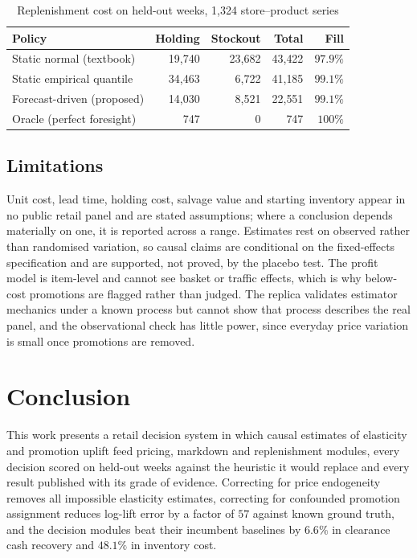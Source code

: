 \documentclass[conference,a4paper]{IEEEtran}
\begin{document}
\begin{table}[!t]
\caption{Replenishment cost on held-out weeks, 1{,}324 store--product series}
\label{tab:inv}
\centering
\footnotesize
\begin{tabular}{lrrrr}
\toprule
Policy & Holding & Stockout & Total & Fill \\
\midrule
Static normal (textbook)   & 19{,}740 & 23{,}682 & 43{,}422 & $97.9\%$ \\
Static empirical quantile  & 34{,}463 &  6{,}722 & 41{,}185 & $99.1\%$ \\
Forecast-driven (proposed) & 14{,}030 &  8{,}521 & 22{,}551 & $99.1\%$ \\
Oracle (perfect foresight) &      747 &        0 &      747 & $100\%$ \\
\bottomrule
\end{tabular}
\end{table}

\subsection{Limitations}
Unit cost, lead time, holding cost, salvage value and starting inventory appear in
no public retail panel and are stated assumptions; where a conclusion depends
materially on one, it is reported across a range. Estimates rest on observed
rather than randomised variation, so causal claims are conditional on the
fixed-effects specification and are supported, not proved, by the placebo test.
The profit model is item-level and cannot see basket or traffic effects, which is
why below-cost promotions are flagged rather than judged. The replica validates
estimator mechanics under a known process but cannot show that process describes
the real panel, and the observational check has little power, since everyday price
variation is small once promotions are removed.

\section{Conclusion}

This work presents a retail decision system in which causal estimates of
elasticity and promotion uplift feed pricing, markdown and replenishment modules,
every decision scored on held-out weeks against the heuristic it would replace and
every result published with its grade of evidence. Correcting for price
endogeneity removes all impossible elasticity estimates, correcting for confounded
promotion assignment reduces log-lift error by a factor of $57$ against known
ground truth, and the decision modules beat their incumbent baselines by $6.6\%$
in clearance cash recovery and $48.1\%$ in inventory cost.
\end{document}
